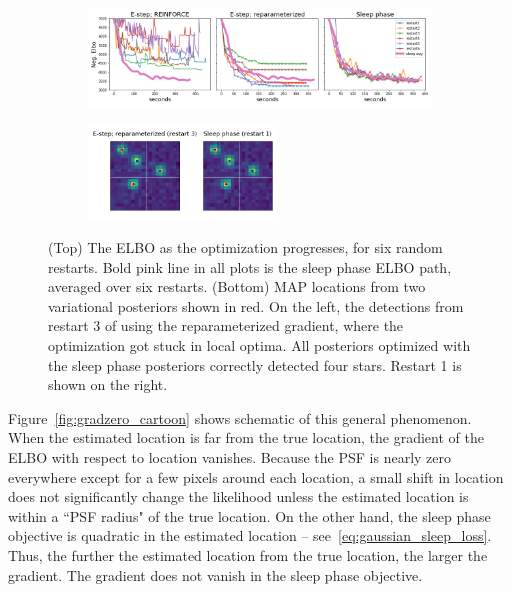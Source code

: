 \begin{figure}[!htb]
    \centering
    \begin{subfigure}[t]{0.9\textwidth}
    \centering
    \includegraphics[width=\textwidth]{figures/optim_path_compare.png}
    \end{subfigure}
    \begin{subfigure}[t]{\textwidth}
    \centering
    \includegraphics[width=0.55\textwidth]{figures/optim_path_detect_compare.png}
    \end{subfigure}
    \vspace{-3em}
    \caption{(Top) The ELBO as the optimization progresses, for six random restarts. Bold pink line in all plots is the sleep phase ELBO path, averaged over six restarts. (Bottom) MAP locations from two variational posteriors shown in red. On the left, the detections from restart 3 of using the reparameterized gradient, where the optimization got stuck in local optima. All posteriors optimized with the sleep phase posteriors correctly detected four stars. Restart 1 is shown on the right. }
    \label{fig:optim_path}
\end{figure}

Figure~\ref{fig:gradzero_cartoon} shows schematic of this general phenomenon. When the estimated location is far from the true location, the gradient of the ELBO with respect to location vanishes. Because the PSF is nearly zero everywhere except for a few pixels around each location, a small shift in location does not significantly change the likelihood unless the estimated location is within a ``PSF radius" of the true location. On the other hand, the sleep phase objective is quadratic in the estimated location -- see~\eqref{eq:gaussian_sleep_loss}. Thus, the further the estimated location from the true location, the larger the gradient. The gradient does not vanish in the sleep phase objective. 

